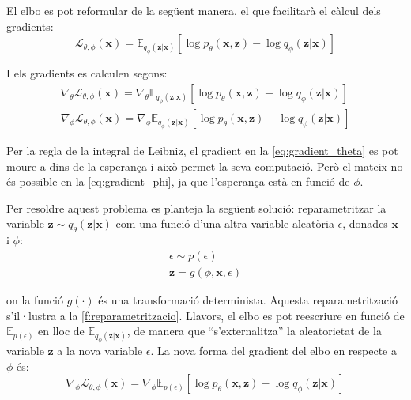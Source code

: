 \documentclass[CAT,BIB]{TFUOC}%
\begin{document}
        El \gls{elbo} es pot reformular de la següent manera,
        el que facilitarà el càlcul dels gradients:
        \begin{equation}
        \label{eq:elbo_2}
            \mathcal{L}_{\theta,\phi}(\mathbf{x}) =
            \mathbb{E}_{q_\phi(\mathbf{z|x})} [
                \log p_\theta(\mathbf{x,z}) -
                \log q_\phi(\mathbf{z|x})
            ]
        \end{equation}

        I els gradients es calculen segons:
        \begin{gather}
        \label{eq:gradient_theta}
            \nabla_\theta \mathcal{L}_{\theta,\phi}(\mathbf{x}) =
            \nabla_\theta \mathbb{E}_{q_\phi(\mathbf{z|x})} [
            \log p_\theta(\mathbf{x,z}) -
            \log q_\phi(\mathbf{z|x})
            ]
        \\
        \label{eq:gradient_phi}
            \nabla_\phi \mathcal{L}_{\theta,\phi}(\mathbf{x}) =
            \nabla_\phi \mathbb{E}_{q_\phi(\mathbf{z|x})} [
            \log p_\theta(\mathbf{x,z}) -
            \log q_\phi(\mathbf{z|x})
            ]
        \end{gather}

        Per la regla de la integral de Leibniz, el gradient en la \cref{eq:gradient_theta} es pot moure a dins de la esperança i això permet la seva computació. Però el mateix no és possible en la \cref{eq:gradient_phi}, ja que l'esperança està en funció de $\phi$.

        Per resoldre aquest problema es planteja la següent solució:
        reparametritzar la variable $\mathbf{z} \sim q_\theta(\mathbf{z|x})$
        com una funció d'una altra variable aleatòria $\epsilon$, donades $\mathbf{x}$ i $\phi$:
        \begin{gather}
        \label{eq:epsilon}
            \epsilon \sim p(\epsilon) \\
        \label{eq:z_reparam}
            \mathbf{z} = g(\phi, \mathbf{x}, \epsilon)
        \end{gather}

        on la funció $g(\cdot)$ és una transformació determinista.
        Aquesta reparametrització s'il·lustra a la \cref{f:reparametritzacio}.
        Llavors, el \gls{elbo} es pot reescriure
        en funció de $\mathbb{E}_{p(\epsilon)}$
        en lloc de $\mathbb{E}_{q_\phi(\mathbf{z|x})}$,
        de manera que ``s'externalitza'' la aleatorietat de la variable $\mathbf{z}$
        a la nova variable $\epsilon$.
        La nova forma del gradient del \gls{elbo} en respecte a $\phi$ és:
        \begin{equation}
        \label{eq:gradient_phi_reparam}
            \nabla_\phi \mathcal{L}_{\theta,\phi}(\mathbf{x}) =
            \nabla_\phi \mathbb{E}_{p(\epsilon)} [
                \log p_\theta(\mathbf{x,z}) -
                \log q_\phi(\mathbf{z|x})
            ]
        \end{equation}
\end{document}
